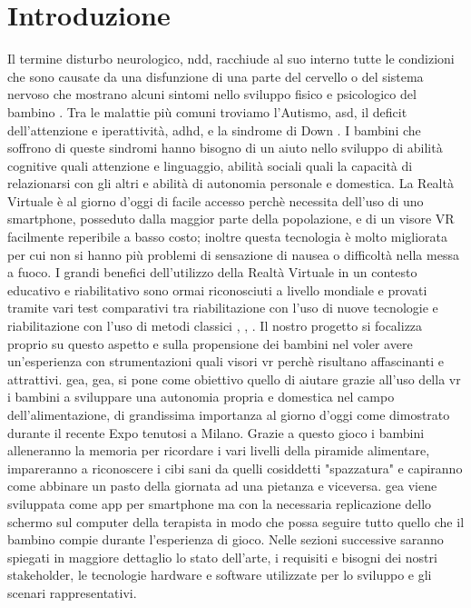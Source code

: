 \section{Introduzione} \label{sec:intro}
Il termine disturbo neurologico, \acs{ndd}, racchiude al suo interno tutte le condizioni che sono causate da una disfunzione di una parte del cervello o del sistema nervoso che mostrano alcuni sintomi nello sviluppo fisico e psicologico del bambino \cite{rif1}. Tra le malattie più comuni troviamo l'Autismo, \acs{asd}, il deficit dell'attenzione e iperattività, \acs{adhd}, e la sindrome di Down \cite{rif2}. I bambini che soffrono di queste sindromi hanno bisogno di un aiuto nello sviluppo di abilità cognitive quali attenzione e linguaggio, abilità sociali quali la capacità di relazionarsi con gli altri e abilità di autonomia personale e domestica. La Realtà Virtuale è al giorno d'oggi di facile accesso perchè necessita dell'uso di uno smartphone, posseduto dalla maggior parte della popolazione, e di un visore VR facilmente reperibile a basso costo; inoltre questa tecnologia è molto migliorata  per cui non si hanno più problemi di sensazione di nausea o difficoltà nella messa a fuoco. I grandi benefici dell'utilizzo della Realtà Virtuale in un contesto educativo e riabilitativo sono ormai riconosciuti a livello mondiale e provati tramite vari test comparativi tra riabilitazione con l'uso di nuove tecnologie e riabilitazione con l'uso di metodi classici \cite{rif3}, \cite{rif4}, \cite{rif5}. Il nostro progetto si focalizza proprio su questo aspetto e sulla propensione dei bambini nel voler avere un'esperienza con strumentazioni quali visori \acs{vr} perchè risultano affascinanti e attrattivi. \acs{gea}, \acl{gea}, si pone come obiettivo quello di aiutare grazie all'uso della \acs{vr} i bambini a sviluppare una autonomia propria e domestica nel campo dell'alimentazione, di grandissima importanza al giorno d'oggi come dimostrato durante il recente Expo tenutosi a Milano. Grazie a questo gioco i bambini alleneranno la memoria per ricordare i vari livelli della piramide alimentare, impareranno a riconoscere i cibi sani da quelli cosiddetti "spazzatura" e capiranno come abbinare un pasto della giornata ad una pietanza e viceversa. \acs{gea} viene sviluppata come app per smartphone ma con la necessaria replicazione dello schermo sul computer della terapista in modo che possa seguire tutto quello che il bambino compie durante l'esperienza di gioco. Nelle sezioni successive saranno spiegati in maggiore dettaglio lo stato dell'arte, i requisiti e bisogni dei nostri stakeholder, le tecnologie hardware e software utilizzate per lo sviluppo e gli scenari rappresentativi.